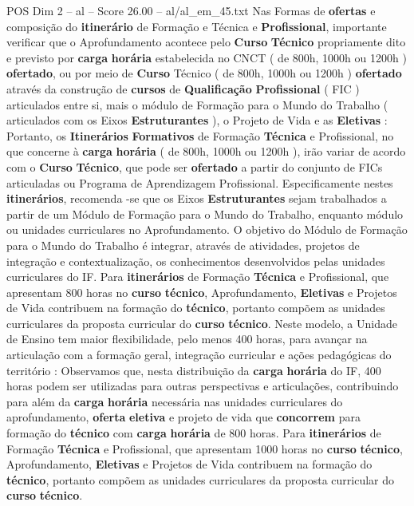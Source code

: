\begin{textsample}{POS Dim 2 – al – Score 26.00 – al/al\_em\_45.txt}
Nas Formas de \textbf{ofertas} e composição do \textbf{itinerário} de Formação e Técnica e \textbf{Profissional}, importante verificar que o Aprofundamento acontece pelo \textbf{Curso} \textbf{Técnico} propriamente dito e previsto por \textbf{carga} \textbf{horária} estabelecida no CNCT ( de 800h, 1000h ou 1200h ) \textbf{ofertado}, ou por meio de \textbf{Curso} Técnico ( de 800h, 1000h ou 1200h ) \textbf{ofertado} através da construção de \textbf{cursos} de \textbf{Qualificação} \textbf{Profissional} ( FIC ) articulados entre si, mais o módulo de Formação para o Mundo do Trabalho ( articulados com os Eixos \textbf{Estruturantes} ), o Projeto de Vida e as \textbf{Eletivas} : Portanto, os \textbf{Itinerários} \textbf{Formativos} de Formação \textbf{Técnica} e Profissional, no que concerne à \textbf{carga} \textbf{horária} ( de 800h, 1000h ou 1200h ), irão variar de acordo com o \textbf{Curso} \textbf{Técnico}, que pode ser \textbf{ofertado} a partir do conjunto de FICs articuladas ou Programa de Aprendizagem Profissional.
Especificamente nestes \textbf{itinerários}, recomenda -se que os Eixos \textbf{Estruturantes} sejam trabalhados a partir de um Módulo de Formação para o Mundo do Trabalho, enquanto módulo ou unidades curriculares no Aprofundamento.
O objetivo do Módulo de Formação para o Mundo do Trabalho é integrar, através de atividades, projetos de integração e contextualização, os conhecimentos desenvolvidos pelas unidades curriculares do IF.
Para \textbf{itinerários} de Formação \textbf{Técnica} e Profissional, que apresentam 800 horas no \textbf{curso} \textbf{técnico}, Aprofundamento, \textbf{Eletivas} e Projetos de Vida contribuem na formação do \textbf{técnico}, portanto compõem as unidades curriculares da proposta curricular do \textbf{curso} \textbf{técnico}.
Neste modelo, a Unidade de Ensino tem maior flexibilidade, pelo menos 400 horas, para avançar na articulação com a formação geral, integração curricular e ações pedagógicas do território : Observamos que, nesta distribuição da \textbf{carga} \textbf{horária} do IF, 400 horas podem ser utilizadas para outras perspectivas e articulações, contribuindo para além da \textbf{carga} \textbf{horária} necessária nas unidades curriculares do aprofundamento, \textbf{oferta} \textbf{eletiva} e projeto de vida que \textbf{concorrem} para formação do \textbf{técnico} com \textbf{carga} \textbf{horária} de 800 horas.
Para \textbf{itinerários} de Formação \textbf{Técnica} e Profissional, que apresentam 1000 horas no \textbf{curso} \textbf{técnico}, Aprofundamento, \textbf{Eletivas} e Projetos de Vida contribuem na formação do \textbf{técnico}, portanto compõem as unidades curriculares da proposta curricular do \textbf{curso} \textbf{técnico}.

\end{textsample}
